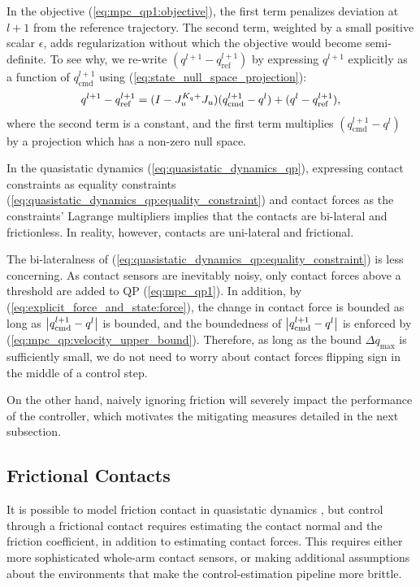 In the objective (\ref{eq:mpc_qp1:objective}), the first term penalizes deviation at $l+1$ from the reference trajectory. The second term, weighted by a small positive scalar $\epsilon$, adds regularization without which the objective would become semi-definite. To see why, we re-write $\left(q^{l+1} - q_\text{ref}^{l+1}\right)$ by expressing $q^{l+1}$ explicitly as a function of $q_\text{cmd}^{l+1}$ using (\ref{eq:state_null_space_projection}):
\begin{equation}
\label{eq:q_minus_q_ref}
q^{l+1} - q_\text{ref}^{l+1} = (I - J_u^{K_q+}J_u) (q^{l+1}_\text{cmd} - q^l) + (q^{l} - \qref[l+1]),
\end{equation}
where the second term is a constant, and the first term multiplies $(q_\text{cmd}^{l+1} - q^l)$ by a projection which has a non-zero null space.

In the quasistatic dynamics (\ref{eq:quasistatic_dynamics_qp}), expressing contact constraints as equality constraints (\ref{eq:quasistatic_dynamics_qp:equality_constraint}) and contact forces as the constraints' Lagrange multipliers implies that the contacts are bi-lateral and frictionless. In reality, however, contacts are uni-lateral and frictional.


The bi-lateralness of (\ref{eq:quasistatic_dynamics_qp:equality_constraint}) is less concerning. As contact sensors are inevitably noisy, only contact forces above a threshold are added to QP (\ref{eq:mpc_qp1}). In addition, by (\ref{eq:explicit_force_and_state:force}), the change in contact force is bounded as long as $\left|\qcmd[l+1] - q^l\right|$ is bounded, and the boundedness of $\left|\qcmd[l+1] - q^l\right|$ is enforced by (\ref{eq:mpc_qp:velocity_upper_bound}). Therefore, as long as the bound $\Delta q_\text{max}$ is sufficiently small, we do not need to worry about contact forces flipping sign in the middle of a control step. 

On the other hand, naively ignoring friction will severely impact the performance of the controller, which motivates the mitigating measures detailed in the next subsection.

\subsection{Frictional Contacts}
It is possible to model friction contact in quasistatic dynamics \cite{pang2021convex}, but control through a frictional contact requires estimating the contact normal and the friction coefficient, in addition to estimating contact forces. This requires either more sophisticated whole-arm contact sensors, or making additional assumptions about the environments that make the control-estimation pipeline more brittle. 

